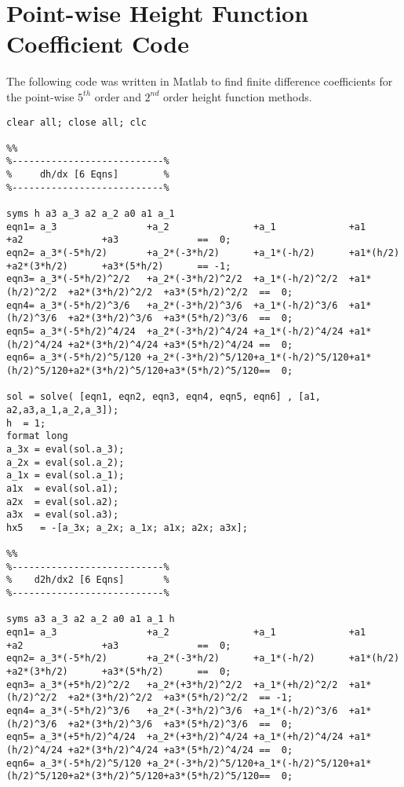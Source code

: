 \chapter{Point-wise Height Function Coefficient Code}\label{appendixa}
The following code was written in Matlab to find finite difference coefficients for the point-wise $5^{th}$ order and $2^{nd}$ order height function methods.
\begin{verbatim}
clear all; close all; clc

%%
%---------------------------%
%     dh/dx [6 Eqns]        %
%---------------------------%

syms h a3 a_3 a2 a_2 a0 a1 a_1
eqn1= a_3                +a_2               +a_1             +a1            +a2              +a3              ==  0;
eqn2= a_3*(-5*h/2)       +a_2*(-3*h/2)      +a_1*(-h/2)      +a1*(h/2)      +a2*(3*h/2)      +a3*(5*h/2)      == -1;
eqn3= a_3*(-5*h/2)^2/2   +a_2*(-3*h/2)^2/2  +a_1*(-h/2)^2/2  +a1*(h/2)^2/2  +a2*(3*h/2)^2/2  +a3*(5*h/2)^2/2  ==  0;
eqn4= a_3*(-5*h/2)^3/6   +a_2*(-3*h/2)^3/6  +a_1*(-h/2)^3/6  +a1*(h/2)^3/6  +a2*(3*h/2)^3/6  +a3*(5*h/2)^3/6  ==  0;
eqn5= a_3*(-5*h/2)^4/24  +a_2*(-3*h/2)^4/24 +a_1*(-h/2)^4/24 +a1*(h/2)^4/24 +a2*(3*h/2)^4/24 +a3*(5*h/2)^4/24 ==  0;
eqn6= a_3*(-5*h/2)^5/120 +a_2*(-3*h/2)^5/120+a_1*(-h/2)^5/120+a1*(h/2)^5/120+a2*(3*h/2)^5/120+a3*(5*h/2)^5/120==  0;

sol = solve( [eqn1, eqn2, eqn3, eqn4, eqn5, eqn6] , [a1, a2,a3,a_1,a_2,a_3]);
h  = 1;
format long
a_3x = eval(sol.a_3);
a_2x = eval(sol.a_2);
a_1x = eval(sol.a_1);
a1x  = eval(sol.a1);
a2x  = eval(sol.a2);
a3x  = eval(sol.a3);
hx5   = -[a_3x; a_2x; a_1x; a1x; a2x; a3x];

%%
%---------------------------%
%    d2h/dx2 [6 Eqns]       %
%---------------------------%

syms a3 a_3 a2 a_2 a0 a1 a_1 h
eqn1= a_3                +a_2               +a_1             +a1            +a2              +a3              ==  0;
eqn2= a_3*(-5*h/2)       +a_2*(-3*h/2)      +a_1*(-h/2)      +a1*(h/2)      +a2*(3*h/2)      +a3*(5*h/2)      ==  0;
eqn3= a_3*(+5*h/2)^2/2   +a_2*(+3*h/2)^2/2  +a_1*(+h/2)^2/2  +a1*(h/2)^2/2  +a2*(3*h/2)^2/2  +a3*(5*h/2)^2/2  == -1;
eqn4= a_3*(-5*h/2)^3/6   +a_2*(-3*h/2)^3/6  +a_1*(-h/2)^3/6  +a1*(h/2)^3/6  +a2*(3*h/2)^3/6  +a3*(5*h/2)^3/6  ==  0;
eqn5= a_3*(+5*h/2)^4/24  +a_2*(+3*h/2)^4/24 +a_1*(+h/2)^4/24 +a1*(h/2)^4/24 +a2*(3*h/2)^4/24 +a3*(5*h/2)^4/24 ==  0;
eqn6= a_3*(-5*h/2)^5/120 +a_2*(-3*h/2)^5/120+a_1*(-h/2)^5/120+a1*(h/2)^5/120+a2*(3*h/2)^5/120+a3*(5*h/2)^5/120==  0;


\end{verbatim}
